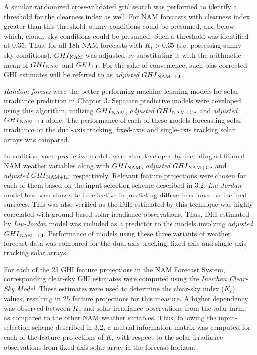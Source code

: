 \par A similar randomized cross-validated grid search was performed to identify a threshold for the clearness index as well. For NAM forecasts with clearness index greater than this threshold, sunny conditions could be presumed, and below which, cloudy sky conditions could be presumed. Such a threshold was identified at 0.35. Thus, for all 18h NAM forecasts with $K_t > 0.35$ (i.e. possessing sunny sky conditions), $GHI\textsubscript{NAM}$ was adjusted by substituting it with the arithmetic mean of $GHI\textsubscript{NAM}$ and $GHI\textsubscript{LJ}$. For the sake of convenience, such bias-corrected GHI estimates will be referred to as \textit{adjusted} $GHI\textsubscript{NAM+LJ}$.

\par \textit{Random forests} were the better performing machine learning models for solar irradiance prediction in Chapter 3. Separate predictive models were developed using this algorithm, utilizing $GHI\textsubscript{NAM}$, \textit{adjusted} $GHI\textsubscript{NAM+CS}$ and \textit{adjusted} $GHI\textsubscript{NAM+LJ}$ alone. The performance of each of these models forecasting solar irradiance on the dual-axis tracking, fixed-axis and single-axis tracking solar arrays was compared.

\par In addition, such predictive models were also developed by including additional NAM weather variables along with $GHI\textsubscript{NAM}$, \textit{adjusted} $GHI\textsubscript{NAM+CS}$ and \textit{adjusted} $GHI\textsubscript{NAM+LJ}$ respectively. Relevant feature projections were chosen for each of them based on the input-selection scheme described in 3.2. \textit{Liu-Jordan} model has been shown to be effective in predicting diffuse irradiance on inclined surfaces. This was also verified as the DHI estimated by this technique was highly correlated with ground-based solar irradiance observations. Thus, DHI estimated by \textit{Liu-Jordan} model was included as a predictor to the models involving \textit{adjusted} $GHI\textsubscript{NAM+LJ}$. Performance of models using these three variants of weather forecast data was compared for the dual-axis tracking, fixed-axis and single-axis tracking solar arrays.
\clearpage

\par For each of the 25 GHI feature projections in the NAM Forecast System, corresponding clear-sky GHI estimates were computed using the \textit{Ineichen Clear-Sky Model}. These estimates were used to determine the clear-sky index ($K_c$) values, resulting in 25 feature projections for this measure. A higher dependency was observed between $K_c$ and solar irradiance observations from the solar farm, as compared to the other NAM weather variables. Thus, following the input-selection scheme described in 3.2, a mutual information matrix was computed for each of the feature projections of $K_c$ with respect to the solar irradiance observations from fixed-axis solar array in the forecast horizon.

